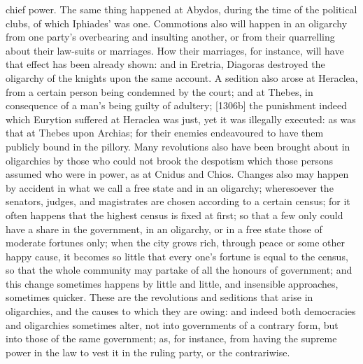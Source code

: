 chief power. The same thing happened at Abydos, during the time of the
political clubs, of which Iphiades' was one. Commotions also will happen
in an oligarchy from one party's overbearing and insulting another, or
from their quarrelling about their law-suits or marriages. How their
marriages, for instance, will have that effect has been already shown: and
in Eretria, Diagoras destroyed the oligarchy of the knights upon the same
account. A sedition also arose at Heraclea, from a certain person being
condemned by the court; and at Thebes, in consequence of a man's being
guilty of adultery; [1306b] the punishment indeed which Eurytion suffered
at Heraclea was just, yet it was illegally executed: as was that at Thebes
upon Archias; for their enemies endeavoured to have them publicly bound in
the pillory. Many revolutions also have been brought about in oligarchies
by those who could not brook the despotism which those persons assumed who
were in power, as at Cnidus and Chios. Changes also may happen by accident
in what we call a free state and in an oligarchy; wheresoever the
senators, judges, and magistrates are chosen according to a certain
census; for it often happens that the highest census is fixed at first; so
that a few only could have a share in the government, in an oligarchy, or
in a free state those of moderate fortunes only; when the city grows rich,
through peace or some other happy cause, it becomes so little that every
one's fortune is equal to the census, so that the whole community may
partake of all the honours of government; and this change sometimes
happens by little and little, and insensible approaches, sometimes
quicker. These are the revolutions and seditions that arise in
oligarchies, and the causes to which they are owing: and indeed both
democracies and oligarchies sometimes alter, not into governments of a
contrary form, but into those of the same government; as, for instance,
from having the supreme power in the law to vest it in the ruling party,
or the contrariwise.


